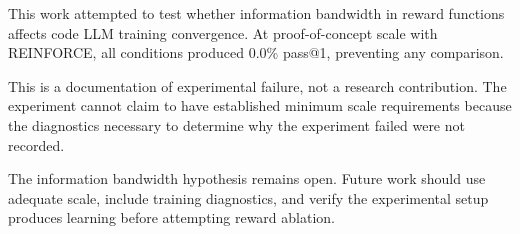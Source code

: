
This work attempted to test whether information bandwidth in reward functions affects code LLM training convergence. At proof-of-concept scale with REINFORCE, all conditions produced 0.0\% pass@1, preventing any comparison.

This is a documentation of experimental failure, not a research contribution. The experiment cannot claim to have established minimum scale requirements because the diagnostics necessary to determine why the experiment failed were not recorded.

The information bandwidth hypothesis remains open. Future work should use adequate scale, include training diagnostics, and verify the experimental setup produces learning before attempting reward ablation.
